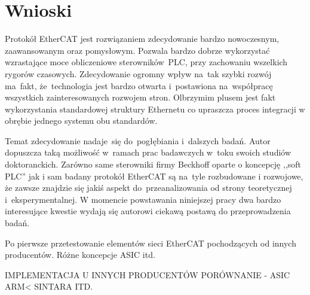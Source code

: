 \section{Wnioski}
Protokół EtherCAT jest rozwiązaniem zdecydowanie bardzo nowoczesnym, zaawansowanym oraz pomysłowym. Pozwala bardzo dobrze wykorzystać wzrastające moce obliczeniowe sterowników~PLC, przy zachowaniu wszelkich rygorów czasowych.
Zdecydowanie ogromny wpływ na~tak szybki rozwój ma~fakt, że~technologia jest bardzo otwarta i~postawiona na~współpracę wszystkich zainteresowanych rozwojem stron. Olbrzymim plusem jest fakt wykorzystania standardowej struktury Ethernetu co upraszcza proces integracji w obrębie jednego systemu obu standardów.

Temat zdecydowanie nadaje~się do~pogłębiania i~dalszych badań. Autor dopuszcza taką możliwość w~ramach prac badawczych w~toku swoich studiów doktoranckich. Zarówno same sterowniki firmy Beckhoff oparte o koncepcję ,,soft PLC'' jak i sam badany protokół EtherCAT są na~tyle rozbudowane i rozwojowe, że zawsze znajdzie się jakiś aspekt do~przeanalizowania od strony teoretycznej i~eksperymentalnej. W momencie powstawania niniejszej pracy dwa bardzo interesujące kwestie wydają się autorowi ciekawą postawą do przeprowadzenia badań.

Po pierwsze przetestowanie elementów sieci EtherCAT pochodzących od innych producentów. Różne koncepcje ASIC itd.

IMPLEMENTACJA U INNYCH PRODUCENTÓW PORÓWNANIE - ASIC ARM< SINTARA ITD.


